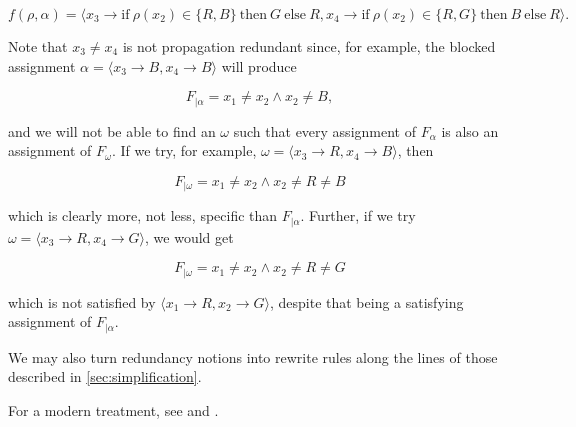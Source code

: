 \begin{equation}
  f(\rho, \alpha) = \langle x_3 \rightarrow \text{if}\ \rho(x_2) \in \{R, B\}\ \text{then}\ G\ \text{else}\ R, x_4 \rightarrow \text{if}\ \rho(x_2) \in \{R, G\}\ \text{then}\ B\ \text{else}\ R \rangle.    
\end{equation}

Note that $x_3 \neq x_4$ is not propagation redundant since, for example, the blocked assignment $\alpha = \langle x_3 \rightarrow B, x_4 \rightarrow B\rangle$ will produce

\begin{equation}
    F_{|\alpha} = x_1 \neq x_2 \wedge x_2 \neq B,
\end{equation}

and we will not be able to find an $\omega$ such that every assignment of $F_{\alpha}$ is also an assignment of $F_{\omega}$. If we try, for example, $\omega = \langle x_3 \rightarrow R, x_4 \rightarrow B\rangle$, then

\begin{equation}
    F_{|\omega} = x_1 \neq x_2 \wedge x_2 \neq R \neq B
\end{equation}

which is clearly more, not less, specific than $F_{|\alpha}$. Further, if we try $\omega = \langle x_3 \rightarrow R, x_4 \rightarrow G\rangle$, we would get

\begin{equation}
    F_{|\omega} = x_1 \neq x_2 \wedge x_2 \neq R \neq G
\end{equation}

which is not satisfied by $\langle x_1 \rightarrow R, x_2 \rightarrow G\rangle$, despite that being a satisfying assignment of $F_{|\alpha}$.

We may also turn redundancy notions into rewrite rules along the lines of those described in \ref{sec:simplification}.

For a modern treatment, see \citep{heule2017short} and \citep{barnett2021non}.




